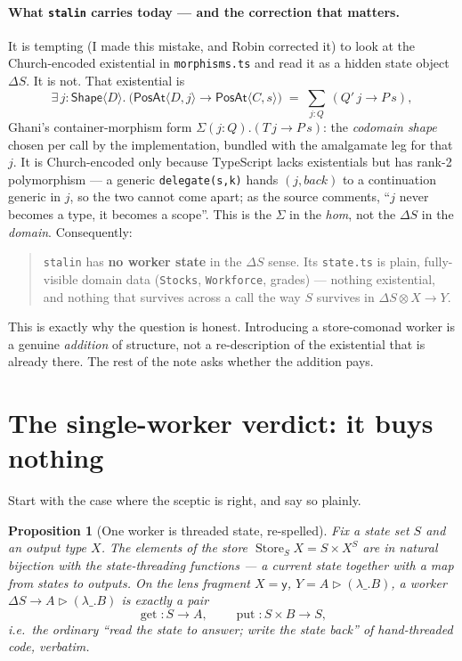\documentclass[11pt]{article}
\newcommand{\ctr}{\mathbin{\triangleright}}      %
\newcommand{\y}{\mathsf{y}}
\DeclareMathOperator{\Store}{Store}
\DeclareMathOperator{\getop}{get}
\DeclareMathOperator{\putop}{put}
\theoremstyle{plain}
\newtheorem{proposition}{Proposition}
\theoremstyle{definition}
\begin{document}
\paragraph{What \texttt{stalin} carries today --- and the correction that matters.} It is tempting
(I made this mistake, and Robin corrected it) to look at the Church-encoded existential in
\texttt{morphisms.ts} and read it as a hidden state object $\Delta S$. It is not. That existential is
\[
  \exists\, j:\mathsf{Shape}\langle D\rangle.\ \big(\mathsf{PosAt}\langle D,j\rangle \to
  \mathsf{PosAt}\langle C,s\rangle\big)
  \;=\; \textstyle\sum_{j:Q}\,(Q'\,j \to P\,s),
\]
Ghani's container-morphism form $\Sigma(j{:}Q).(T\,j\to P\,s)$: the \emph{codomain shape} chosen
per call by the implementation, bundled with the amalgamate leg for that $j$. It is Church-encoded
only because TypeScript lacks existentials but has rank-2 polymorphism --- a generic
\texttt{delegate(s,k)} hands $(j,\mathit{back})$ to a continuation generic in $j$, so the two cannot
come apart; as the source comments, ``$j$ never becomes a type, it becomes a scope''. This is the
$\Sigma$ in the \emph{hom}, not the $\Delta S$ in the \emph{domain}. Consequently:
\begin{quote}
\texttt{stalin} has \textbf{no worker state} in the $\Delta S$ sense. Its \texttt{state.ts} is plain,
fully-visible domain data (\texttt{Stocks}, \texttt{Workforce}, grades) --- nothing existential, and
nothing that survives across a call the way $S$ survives in $\Delta S\otimes X\to Y$.
\end{quote}
This is exactly why the question is honest. Introducing a store-comonad worker is a genuine
\emph{addition} of structure, not a re-description of the existential that is already there. The rest
of the note asks whether the addition pays.

\section{The single-worker verdict: it buys nothing}\label{sec:single}

Start with the case where the sceptic is right, and say so plainly.

\begin{proposition}[One worker is threaded state, re-spelled]\label{prop:single}
Fix a state set $S$ and an output type $X$. The elements of the store $\Store_S X = S\times X^{S}$
are in natural bijection with the state-threading functions --- a current state together with a
map from states to outputs. On the lens fragment $X=\y$, $Y=A\ctr(\lambda\_.B)$, a worker
$\Delta S\to A\ctr(\lambda\_.B)$ is exactly a pair
\[
  \getop : S\to A,\qquad \putop : S\times B\to S,
\]
i.e.\ the ordinary ``read the state to answer; write the state back'' of hand-threaded code, verbatim.
\end{proposition}
\end{document}
